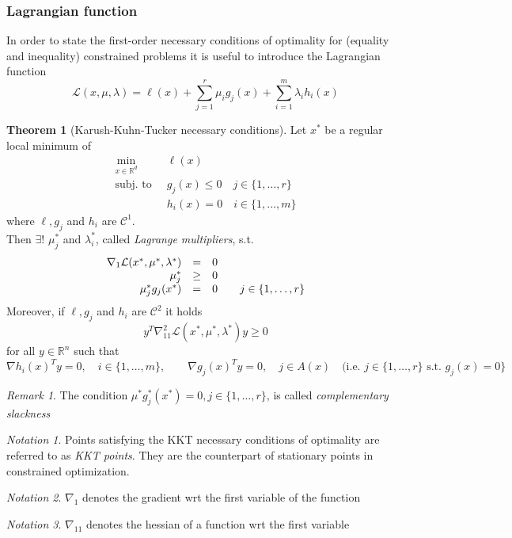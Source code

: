 \documentclass[openany]{book}
\newcommand{\R}{\mathbb{R}} %
\theoremstyle{definition}
\newtheorem{theorem}{Theorem}[section] %
\theoremstyle{remark}
\newtheorem*{remark}{Remark} %
\newtheorem*{notation}{Notation} %
\begin{document}
\subsubsection{Lagrangian function}
In order to state the first-order necessary conditions of optimality for (equality and inequality) constrained problems it is useful to introduce the Lagrangian function 
\[
    \mathcal{L}(x,\mu,\lambda)=\ell(x)+\displaystyle\sum_{j=1}^{r}\mu_ig_j(x) + \displaystyle\sum_{i=1}^{m}\lambda_i h_i(x)
\]
\begin{theorem}[Karush-Kuhn-Tucker necessary conditions]
    Let $x^*$ be a regular local minimum of 
    \begin{align*}
        \min_{x\in\R^d}\  &\ell(x) \\
        \text{subj. to }\  & g_j(x)\leq 0 \quad j\in\{1,\dots,r\}\\
        & h_i(x)=0 \quad i\in\{1,\dots,m\}
    \end{align*}
    where $\ell,g_j$ and $h_i$ are $\mathcal{C}^1$. \\
    Then $\exists!$  $\mu_j^*$ and $\lambda_i^*$, called \emph{Lagrange multipliers}, s.t.
    \[
        \begin{array}{ r c l}
            \nabla_1\mathcal{L}(x^*,\mu^*,\lambda^*) & = & 0 \\             \mu_j^* & \geq & 0 \\
            \mu^*_jg_j(x^*) & = & 0 \qquad j\in \{1,\dots,r\} 
        \end{array}
    \]
    Moreover, if $\ell, g_j$ and $h_i$ are $\mathcal{C}^2$ it holds
    \[
        y^T\nabla_{11}^2\mathcal{L}(x^*,\mu^*,\lambda^*)y \geq 0
    \]
    for all $y\in\R^n$ such that
    \[
    \nabla h_i(x)^Ty = 0, \quad i\in\{1,\dots,m\}, \qquad \nabla g_j(x)^Ty = 0, \quad j\in A(x) \quad \text{(i.e. } j\in\{1,\dots,r\} \text{ s.t. } g_j(x)=0\}
\]
\end{theorem}
\begin{remark}
    The condition $\mu^*g_j^*(x^*)=0,j\in\{1,\dots,r\}$, is called \emph{complementary slackness}
\end{remark}
\begin{notation}
    Points satisfying the KKT necessary conditions of optimality are referred to as \emph{KKT points}. They are the counterpart of stationary points in constrained optimization.
\end{notation}
\begin{notation}
    $\nabla_1$ denotes the gradient wrt the first variable of the function
\end{notation}
\begin{notation}
    $\nabla_{11}$ denotes the hessian of a function wrt the first variable
\end{notation}
\end{document}
